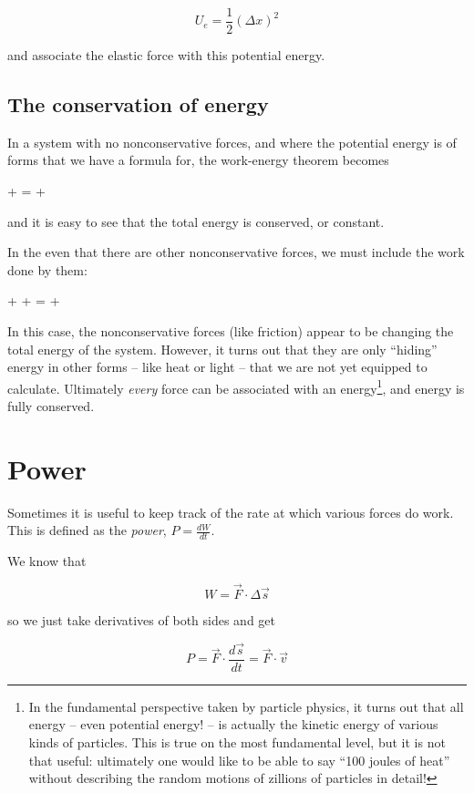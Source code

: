 \documentclass[10pt]{article}
\begin{document}
$$U_e = \frac{1}{2}(\Delta x)^2$$

and associate the elastic force with this potential energy.

\subsection{The conservation of energy}

In a system with no nonconservative forces, and where the potential energy is of forms that we have a formula for, the work-energy theorem becomes

 +   =  + 

and it is easy to see that the total energy is conserved, or constant.

In the even that there are other nonconservative forces, we must include the work done by them:

 +  + =  + 

In this case, the nonconservative forces (like friction) appear to be changing the total energy of the system. However, it turns out that they are only ``hiding'' energy in other forms -- like heat or light -- that we are not yet equipped to calculate. Ultimately {\it every} force can be associated with an energy\footnote{In the fundamental perspective taken by particle physics, it turns out that all energy -- even potential energy! -- is actually the kinetic energy of various kinds of particles. This is true on  the most fundamental level, but it is not that useful: ultimately one would like to be able to say ``100 joules of heat'' without describing the random motions of zillions of particles in detail!}, and energy is fully conserved.

\section{Power}

Sometimes it is useful to keep track of the rate at which various forces do work. This is defined as the {\it power}, $P = \frac{dW}{dt}.$

We know that 

$$W = \vec F \cdot \Delta \vec s$$

so we just take derivatives of both sides and get

$$P = \vec F \cdot \frac{d\vec s}{dt} = \vec F \cdot \vec v$$
\end{document}
